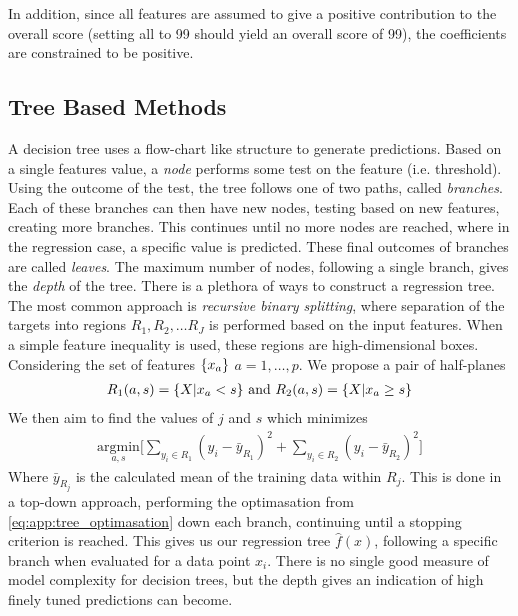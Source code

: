         In addition, since all features are assumed to give a positive contribution to the overall score (setting all to 99 should yield an overall score of 99), the coefficients are constrained to be positive.  
        
        \subsection{Tree Based Methods}
            A decision tree uses a flow-chart like structure to generate predictions. Based on a single features value, a \textit{node} performs some test on the feature (i.e. threshold). Using the outcome of the test, the tree follows one of two paths, called \textit{branches}. Each of these branches can then have new nodes, testing based on new features, creating more branches. This continues until no more nodes are reached, where in the regression case, a specific value is predicted. These final outcomes of branches are called \textit{leaves}. The maximum number of nodes, following a single branch, gives the \textit{depth} of the tree. 
            There is a plethora of ways to construct a regression tree. The most common approach is \textit{recursive binary splitting}, where separation of the targets into regions $R_1, R_2, \ldots R_J$ is performed based on the input features. When a simple feature inequality is used, these regions are high-dimensional boxes. Considering the set of features $\{x_a\}$ $a = 1,\ldots,p$. We propose a pair of half-planes 
            \begin{align*}
                R_1(a,s) = \{X | x_a < s\} \text{ and } R_2(a,s) = \{X | x_a \geq s\}
            \end{align*}
            We then aim to find the values of $j$ and $s$ which minimizes
            \begin{align}
                \underset{a,s}{\text{argmin}}\Bigg[ \sum_{y_i \in R_1} (y_i - \bar{y}_{R_1})^2 + \sum_{y_i \in R_2} (y_i - \bar{y}_{R_2})^2 \Bigg] \label{eq:app:tree_optimasation} 
            \end{align}
            Where $\bar{y}_{R_j}$ is the calculated mean of the training data within $R_j$. This is done in a top-down approach, performing the optimasation from \cref{eq:app:tree_optimasation} down each branch, continuing until a stopping criterion is reached. This gives us our regression tree $\hat{f}(x)$, following a specific branch when evaluated for a data point $x_i$. There is no single good measure of model complexity for decision trees, but the depth gives an indication of high finely tuned predictions can become.    

